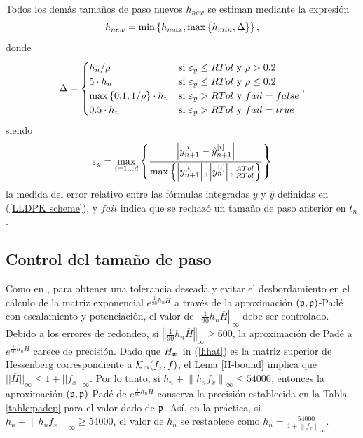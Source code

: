 Todos los demás tamaños de paso nuevos $h_{new}$ se estiman mediante la expresión
\begin{equation}
    h_{new} = \min\left\{ h_{max},\max\left\{ h_{min},\Delta \right\} \right\}, \label{hnewcalc}
\end{equation}
donde
\begin{equation*}
    \Delta = \begin{cases}
        h_n/\rho & \text{si } \varepsilon_y\leq RTol \text{ y } \rho>0\mathord{.}2\\
        5\cdot h_n & \text{si } \varepsilon_y\leq RTol \text{ y } \rho\leq 0\mathord{.}2\\
        \max\left\{ 0\mathord{.}1,1/\rho \right\}\cdot h_n & \text{si } \varepsilon_y > RTol \text{ y } fail=false\\
        0\mathord{.}5\cdot h_n & \text{si } \varepsilon_y > RTol \text{ y } fail=true
        \end{cases},
\end{equation*}
siendo
\begin{equation}\label{epsilon_y}
	\varepsilon_y =  \max_{i=1\ldots d}\left\{ \frac{\left\lvert y^{[i]}_{n+1}-\hat{y}^{[i]}_{n+1} \right\rvert}
	{\max\left\{ \left\lvert y^{[i]}_{n+1}  \right\rvert,\left\lvert y^{[i]}_{n}\right\rvert,\frac{ATol}{RTol} \right\}} \right\}
\end{equation}
la medida del error relativo entre las fórmulas integradas $y$ y $\hat{y}$ definidas en (\ref{LLDPK scheme}), y $fail$ indica que se rechazó un tamaño de paso anterior en $t_n$.

\subsection{Control del tamaño de paso}\label{secc:hcontrol}
Como en \cite{Jimenez14AMC}, para obtener una tolerancia deseada y evitar el desbordamiento en el cálculo de la matriz exponencial $e^{\frac{1}{90}h_n\overline{H}}$ a través de la aproximación $(\mathfrak{p},\mathfrak{p})$-Padé con escalamiento y potenciación, el valor de $\left\Vert \frac{1}{90}h_n\overline{H} \right\Vert_\infty$ debe ser controlado. Debido a los errores de redondeo, si $\left\Vert \frac{1}{90}h_n\overline{H} \right\Vert_\infty \ge 600$, la aproximación de Padé a $e^{\frac{1 }{90}h_n\overline{H}}$ carece de precisión. Dado que $H_{\mathfrak{m}}$ in (\ref{hhat}) es la matriz superior de Hessenberg correspondiente a $\mathcal{K}_{\mathfrak{m}}(f_x,f)$, el Lema \ref{H-bound} implica que $|| \overline{H} ||_\infty \leq 1 + || f_x ||_\infty$. Por lo tanto, si $h_n + \left\lVert h_nf_x \right\rVert_\infty \leq 54000$, entonces la aproximación $(\mathfrak{p},\mathfrak{p})$-Padé de $e^{\frac{1}{90}h_n \overline{H}}$ conserva la precisión establecida en la Tabla \ref{table:padep} para el valor dado de $\mathfrak{p}$. Así, en la práctica, si $h_n + \left\lVert h_nf_x \right\rVert_\infty \ge 54000$, el valor de $h_n$ se restablece como $h_n=\frac{54000}{1+\left\lVert f_x \right\rVert_\infty}$.

